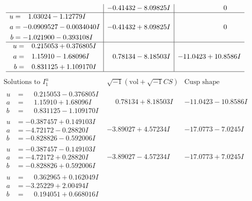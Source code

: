 \documentclass[1p]{elsarticle_modified}
\theoremstyle{definition}
\newcommand{\I}{\sqrt{-1}}
\begin{document}
$$\begin{array}{c|c|c}
 & -0.41432 - 8.09825 I & \phantom{-0.000000 } 0 \\ \hline\begin{aligned}
u &= \phantom{-}1.03024 - 1.12779 I \\
a &= -0.0909527 - 0.0034040 I \\
b &= -1.021900 - 0.393108 I\end{aligned}
 & -0.41432 + 8.09825 I & \phantom{-0.000000 } 0 \\ \hline\begin{aligned}
u &= \phantom{-}0.215053 + 0.376805 I \\
a &= \phantom{-}1.15910 - 1.68096 I \\
b &= \phantom{-}0.831125 + 1.109170 I\end{aligned}
 & \phantom{-}0.78134 - 8.18503 I & -11.0423 + 10.8586 I\\
 \hline 
 \end{array}$$\newpage$$\begin{array}{c|c|c}  
\text{Solutions to }I^u_{1}& \I (\text{vol} + \sqrt{-1}CS) & \text{Cusp shape}\\
 \hline 
\begin{aligned}
u &= \phantom{-}0.215053 - 0.376805 I \\
a &= \phantom{-}1.15910 + 1.68096 I \\
b &= \phantom{-}0.831125 - 1.109170 I\end{aligned}
 & \phantom{-}0.78134 + 8.18503 I & -11.0423 - 10.8586 I \\ \hline\begin{aligned}
u &= -0.387457 + 0.149103 I \\
a &= -4.72172 - 0.28820 I \\
b &= -0.828826 - 0.592006 I\end{aligned}
 & -3.89027 + 4.57234 I & -17.0773 - 7.0245 I \\ \hline\begin{aligned}
u &= -0.387457 - 0.149103 I \\
a &= -4.72172 + 0.28820 I \\
b &= -0.828826 + 0.592006 I\end{aligned}
 & -3.89027 - 4.57234 I & -17.0773 + 7.0245 I \\ \hline\begin{aligned}
u &= \phantom{-}0.362965 + 0.162049 I \\
a &= -3.25229 + 2.00494 I \\
b &= \phantom{-}0.194051 + 0.668016 I\end{aligned}

\end{array}$$
\end{document}
